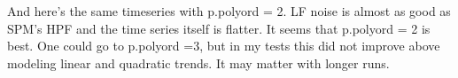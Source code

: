 \documentclass[12pt]{article}
\begin{document}
\vspace{\baselineskip}
\noindent%
\begin{minipage}{\linewidth}
\end{minipage}

\vspace{\baselineskip}
\noindent
And here’s the same timeseries with p.polyord = 2. LF noise is almost as good as SPM's HPF and the time series itself is flatter. It seems that p.polyord = 2 is best. One could go to p.polyord =3, but in my tests this did not improve above modeling linear and quadratic trends. It may matter with longer runs.

\vspace{\baselineskip}
\noindent%
\begin{minipage}{\linewidth}
\end{minipage}
\newpage
\end{document}
